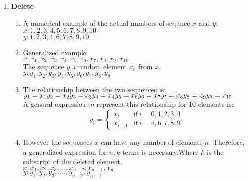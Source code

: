 \documentclass[letterpaper, 24pt, final, onecolumn, titlepage] {article}
\begin{document}
\begin {enumerate}
\begin{enumerate}
 				 A general expression to represent this relationship for $n$ elements is:\\
				 $y_i=x_i+x_{i+1}\hspace{10mm}i=1,....n$.
		\end{enumerate}
	\item \textbf{Delete}
		\begin{enumerate}
			\item A numerical example of the actual numbers of sequnce $x$ and $y$:\\
				$x:1,2,3,4,5,6,7,8,9,10$\\
				$y:1,2,3,4,6,7,8,9,10$\\
			\item Generalized example:\\
				$x:x_1,x_2,x_3,x_4,x_5,x_6,x_7,x_8,x_9,x_{10}$\\
				The sequence $y$ a random element $x_5$ from $x$.\\
				$y:y_1,y_2,y_3,y_4,y_5,y_6,y_7,y_8,y_9$\\
			\item The relationship between the two sequences is:\\
				 $y_1=x_1\\
				 y_2=x_2\\
				 y_3=x_3\\
			 	 y_4=x_4\\
				 y_5=x_6\\
				 y_6=x_7\\
				 y_7=x_8\\
			 	 y_8=x_9\\
				 y_9=x_{10}$\\
				 A general expression to represent this relationship for 10 elements is:\\
				\[
					y_i=
					\begin{cases}
  						x_i & \text{if}\ i=0,1,2,3,4 \\
 					 	x_{i+1}           & \text{if}\ i=5,6,7,8,9
					\end{cases}
				\]
			\item However the sequences $x$ can have any number of elements $n$. Therefore, a generalized expression for $n,k$ terms is necessary.Where $k$ is the subscript of the deleted element.\\
				$x:x_1,x_2,x_3,...,x_{n-2},x_{n-1},x_n$\\
				$y:y_1,y_2,y_3,....,y_{n-2},y_{n-1}$\\\\\\\\\\\\\

\end{enumerate}
\end{enumerate}
\end{document}
